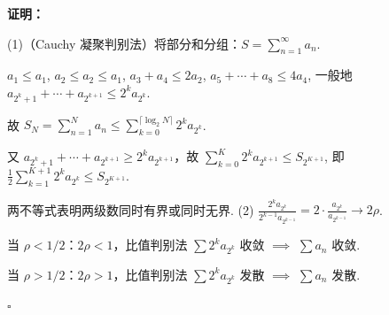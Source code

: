 \documentclass[12pt,a4paper]{article}
\newenvironment{sol}[1][解]{%
  \par\medskip\noindent\textbf{#1：}\itshape\par\noindent\ignorespaces
}{%
  \par\hfill$\square$\par\medskip
}
\begin{document}
\begin{sol}[证明](1)（Cauchy 凝聚判别法）将部分和分组：$S=\sum_{n=1}^{\infty}a_n$.

  $a_1\le a_1$, $a_2\le a_2\le a_1$, $a_3+a_4\le 2a_2$,
  $a_5+\cdots+a_8\le 4a_4$, 一般地 $a_{2^k+1}+\cdots+a_{2^{k+1}}\le 2^ka_{2^k}$.

  故 $S_N=\sum_{n=1}^{N}a_n\le\sum_{k=0}^{\lceil\log_2 N\rceil}2^ka_{2^k}$.

  又 $a_{2^k+1}+\cdots+a_{2^{k+1}}\ge 2^ka_{2^{k+1}}$，故
  $\sum_{k=0}^{K}2^ka_{2^{k+1}}\le S_{2^{K+1}}$, 即
  $\frac{1}{2}\sum_{k=1}^{K+1}2^ka_{2^k}\le S_{2^{K+1}}$.

  两不等式表明两级数同时有界或同时无界.
  (2)
  $\frac{2^ka_{2^k}}{2^{k-1}a_{2^{k-1}}}=2\cdot\frac{a_{2^k}}{a_{2^{k-1}}}\to
  2\rho$.

  当 $\rho<1/2$：$2\rho<1$，比值判别法 $\sum 2^ka_{2^k}$ 收敛 $\implies$ $\sum a_n$ 收敛.

  当 $\rho>1/2$：$2\rho>1$，比值判别法 $\sum 2^ka_{2^k}$ 发散 $\implies$ $\sum a_n$ 发散.
\end{sol}
\end{document}
